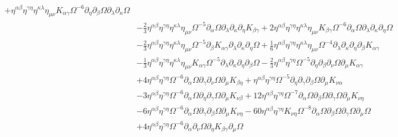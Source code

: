 \documentclass[10pt,letterpaper]{article}
\begin{document}
\begin{align}
 + \eta^{\alpha \beta} \eta^{\gamma \eta} \eta^{\kappa \lambda} \eta_{\mu \nu} K_{\alpha \gamma} \Omega^{-6} \partial_{\eta}\partial_{\beta}\Omega \partial_{\lambda}\partial_{\kappa}\Omega\nonumber\\
& -  \tfrac{2}{3} \eta^{\alpha \beta} \eta^{\gamma \eta} \eta^{\kappa \lambda} \eta_{\mu \nu} \Omega^{-5} \partial_{\alpha}\Omega \partial_{\lambda}\partial_{\kappa}\partial_{\eta}K_{\beta \gamma}
 + 2 \eta^{\alpha \beta} \eta^{\gamma \eta} \eta^{\kappa \lambda} \eta_{\mu \nu} K_{\beta \gamma} \Omega^{-6} \partial_{\alpha}\Omega \partial_{\lambda}\partial_{\kappa}\partial_{\eta}\Omega\nonumber\\
& -  \tfrac{2}{3} \eta^{\alpha \beta} \eta^{\gamma \eta} \eta^{\kappa \lambda} \eta_{\mu \nu} \Omega^{-5} \partial_{\beta}K_{\alpha \gamma} \partial_{\lambda}\partial_{\kappa}\partial_{\eta}\Omega
 + \tfrac{1}{6} \eta^{\alpha \beta} \eta^{\gamma \eta} \eta^{\kappa \lambda} \eta_{\mu \nu} \Omega^{-4} \partial_{\lambda}\partial_{\kappa}\partial_{\eta}\partial_{\beta}K_{\alpha \gamma}\nonumber\\
& -  \tfrac{1}{3} \eta^{\alpha \beta} \eta^{\gamma \eta} \eta^{\kappa \lambda} \eta_{\mu \nu} K_{\alpha \gamma} \Omega^{-5} \partial_{\lambda}\partial_{\kappa}\partial_{\eta}\partial_{\beta}\Omega
 -  \tfrac{2}{3} \eta^{\alpha \beta} \eta^{\gamma \eta} \Omega^{-5} \partial_{\eta}\partial_{\beta}\partial_{\nu}\Omega \partial_{\mu}K_{\alpha \gamma}\nonumber\\
& + 4 \eta^{\alpha \beta} \eta^{\gamma \eta} \Omega^{-6} \partial_{\alpha}\Omega \partial_{\gamma}\partial_{\nu}\Omega \partial_{\mu}K_{\beta \eta}
 + \eta^{\alpha \beta} \eta^{\gamma \eta} \Omega^{-5} \partial_{\eta}\partial_{\gamma}\partial_{\beta}\Omega \partial_{\mu}K_{\nu \alpha}\nonumber\\
& - 3 \eta^{\alpha \beta} \eta^{\gamma \eta} \Omega^{-6} \partial_{\alpha}\Omega \partial_{\eta}\partial_{\gamma}\Omega \partial_{\mu}K_{\nu \beta}
 + 12 \eta^{\alpha \beta} \eta^{\gamma \eta} \Omega^{-7} \partial_{\alpha}\Omega \partial_{\beta}\Omega \partial_{\gamma}\Omega \partial_{\mu}K_{\nu \eta}\nonumber\\
& - 6 \eta^{\alpha \beta} \eta^{\gamma \eta} \Omega^{-6} \partial_{\alpha}\Omega \partial_{\gamma}\partial_{\beta}\Omega \partial_{\mu}K_{\nu \eta}
 - 60 \eta^{\alpha \beta} \eta^{\gamma \eta} K_{\nu \eta} \Omega^{-8} \partial_{\alpha}\Omega \partial_{\beta}\Omega \partial_{\gamma}\Omega \partial_{\mu}\Omega\nonumber\\
& + 4 \eta^{\alpha \beta} \eta^{\gamma \eta} \Omega^{-6} \partial_{\alpha}\partial_{\nu}\Omega \partial_{\eta}K_{\beta \gamma} \partial_{\mu}\Omega

\end{align}
\end{document}
